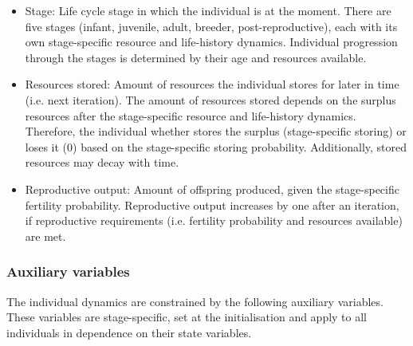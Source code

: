 \documentclass{article}
\begin{document}
\begin{itemize}
\begin{itemize}
        \item Stage: Life cycle stage in which the individual is at the moment. There are five stages (infant, juvenile, adult, breeder, post-reproductive), each with its own stage-specific resource and life-history dynamics. Individual progression through the stages is determined by their age and resources available.
        \item Resources stored: Amount of resources the individual stores for later in time (i.e. next iteration). The amount of resources stored depends on the surplus resources after the stage-specific resource and life-history dynamics. Therefore, the individual whether stores the surplus (stage-specific storing) or loses it (0) based on the stage-specific storing probability. Additionally, stored resources may decay with time.
        \item Reproductive output: Amount of offspring produced, given the stage-specific fertility probability. Reproductive output increases by one after an iteration, if reproductive requirements (i.e. fertility probability and resources available) are met.
    \end{itemize}
\end{itemize}

\subsubsection{Auxiliary variables}

The individual dynamics are constrained by the following auxiliary variables. These variables are stage-specific, set at the initialisation and apply to all individuals in dependence on their state variables.
\end{document}
